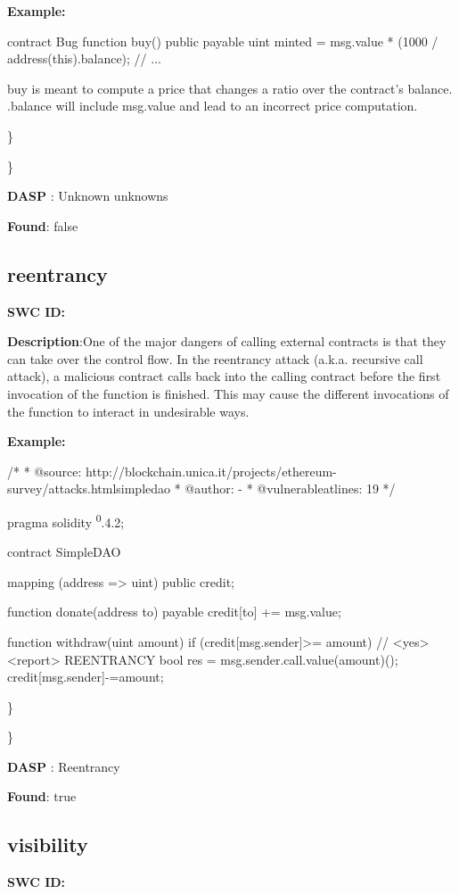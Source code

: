\documentclass{article}
\begin{document}
\textbf{Example:} 

contract Bug{
  function buy() public payable{
    uint minted = msg.value * (1000 / address(this).balance);
    // ...
  }
}

buy is meant to compute a price that changes a ratio over the contract's balance. .balance will include msg.value and lead to an incorrect price computation.

\} 

\} 

\textbf{DASP} : Unknown unknowns

\textbf{Found}: false

\subsection{reentrancy} 
\textbf{SWC \textunderscore ID:} 

\textbf{Description}:One of the major dangers of calling external contracts is that they can take over the control flow. In the reentrancy attack (a.k.a. recursive call attack), a malicious contract calls back into the calling contract before the first invocation of the function is finished. This may cause the different invocations of the function to interact in undesirable ways.


\textbf{Example:} 

/*
* @source: http://blockchain.unica.it/projects/ethereum-survey/attacks.htmlsimpledao
* @author: -
* @vulnerable\textunderscore at\textunderscore lines: 19
*/

pragma solidity \textsuperscript0.4.2;

contract SimpleDAO {
  mapping (address => uint) public credit;

  function donate(address to) payable {
    credit[to] += msg.value;
  }

  function withdraw(uint amount) {
    if (credit[msg.sender]>= amount) {
      // <yes> <report> REENTRANCY
      bool res = msg.sender.call.value(amount)();
      credit[msg.sender]-=amount;
    }
  }
}

\} 

\} 

\textbf{DASP} : Reentrancy

\textbf{Found}: true

\subsection{visibility} 
\textbf{SWC \textunderscore ID:} 
\end{document}
